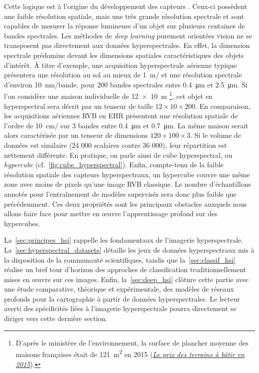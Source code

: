 Cette logique est à l'origine du développement des capteurs . Ceux-ci possèdent une faible résolution spatiale, mais une très grande résolution spectrale et sont capables de mesurer la réponse lumineuse d'un objet sur plusieurs centaines de bandes spectrales. Les méthodes de \emph{deep learning} purement orientées vision ne se transposent pas directement aux données hyperspectrales. En effet, la dimension spectrale prédomine devant les dimensions spatiales caractéristiques des objets d'intérêt. À titre d'exemple, une acquisition hyperspectrale aérienne typique présentera une résolution au sol au mieux de \SI{1}{\meter/\px} et une résolution spectrale d'environ \SI{10}{\nano\meter/bande}, pour 200 bandes spectrales entre \SI{0,4}{\micro\meter} et \SI{2,5}{\micro\meter}. Si l'on considère une maison individuelle de \SI{12x10}{\meter} \footnote{D'après le ministère de l'environnement, la surface de plancher moyenne des maisons françaises était de \SI{121}{\meter\squared} en 2015 (\href{http://www.cohesion-territoires.gouv.fr/IMG/pdf/datalab-essentiel-51-le-prix-des-terrains-a-batir-en-2015-oct2016.pdf}{\og \emph{Le prix des terrains à bâtir en 2015\fg}}).}, cet objet en hyperspectral sera décrit par un tenseur de taille $12\times10\times200$.
En comparaison, les acquisitions aériennes \gls{RVB} en \gls{EHR} présentent une résolution spatiale de l'ordre de \SI{10}{\centi\meter/\px} sur 3 bandes entre \SI{0,4}{\micro\meter} et \SI{0,7}{\micro\meter}. La même maison serait alors caractérisée par un tenseur de dimensions $120\times100\times3$. Si le volume de données est similaire (24 000 scalaires contre 36 000), leur répartition est nettement différente. En pratique, on parle ainsi de cube hyperspectral, ou \emph{hypercube} (cf.~\cref{fig:cube_hyperspectral}). Enfin, compte-tenu de la faible résolution spatiale des capteurs hyperspectraux, un hypercube couvre une même zone avec moins de pixels qu'une image \gls{RVB} classique. Le nombre d'échantillons annotés pour l'entraînement de modèles supervisés sera donc plus faible que précédemment. Ces deux propriétés sont les principaux obstacles auxquels nous allons faire face pour mettre en \oe{}uvre l'apprentissage profond sur des hypercubes.

La~\cref{sec:principes_hsi} rappelle les fondamentaux de l'imagerie hyperspectrale. La~\cref{sec:hyperspectral_datasets} détaille les jeux de données hyperspectraux mis à la disposition de la communauté scientifiques, tandis que la~\cref{sec:classif_hsi} réalise un bref tour d'horizon des approches de classification traditionnellement mises en \oe{}uvre sur ces images. Enfin, la~\cref{sec:deep_hsi} clôture cette partie avec une étude comparative, théorique et expérimentale, des modèles de réseaux profonds pour la cartographie à partir de données hyperspectrales. Le lecteur averti des spécificités liées à l'imagerie hyperspectrale pourra directement se diriger vers cette dernière section.


